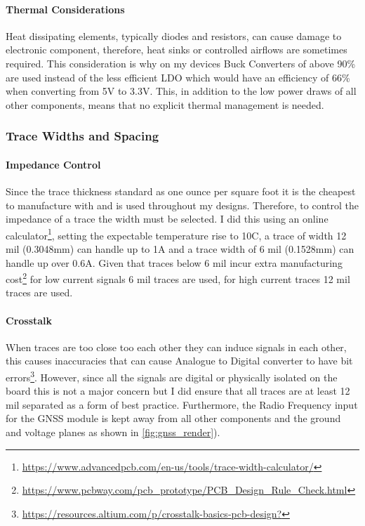 \paragraph{Thermal Considerations}
Heat dissipating elements, typically diodes and resistors, can cause damage to electronic component, therefore, heat sinks or controlled airflows are sometimes required. This consideration is why on my devices Buck Converters of above 90\% are used instead of the less efficient \gls{LDO} which would have an efficiency of 66\% when converting from 5V to 3.3V. This, in addition to the low power draws of all other components, means that no explicit thermal management is needed.

\subsubsection{Trace Widths and Spacing}\label{sub_sub_section:tgt_trace_width}
\paragraph{Impedance Control}
 Since the trace thickness standard as one ounce per square foot it is the cheapest to manufacture with and is used throughout my designs. Therefore, to control the impedance of a trace the width must be selected. I did this using an online calculator\footnote{\url{https://www.advancedpcb.com/en-us/tools/trace-width-calculator/}}, setting the expectable temperature rise to 10\degree C, a trace of width 12 mil (0.3048mm) can handle up to 1A and a trace width of 6 mil (0.1528mm) can handle up over 0.6A. Given that traces below 6 mil incur extra manufacturing cost\footnote{\url{https://www.pcbway.com/pcb_prototype/PCB_Design_Rule_Check.html}} for low current signals 6 mil traces are used, for high current traces 12 mil traces are used.
\paragraph{Crosstalk}
When traces are too close too each other they can induce signals in each other, this causes inaccuracies that can cause Analogue to Digital converter to have bit errors\footnote{\url{https://resources.altium.com/p/crosstalk-basics-pcb-design?}}. However, since all the signals are digital or physically isolated on the board this is not a major concern but I did ensure that all traces are at least 12 mil separated as a form of best practice. Furthermore, the Radio Frequency input for the \gls{GNSS} module is kept away from all other components and the ground and voltage planes as shown in \ref{fig:gnss_render}).

